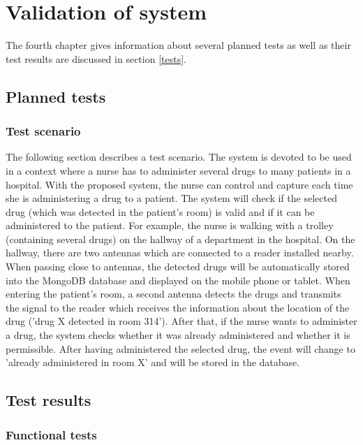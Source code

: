 \chapter{Validation of system}
\label{Kap4}

The fourth chapter gives information about several planned tests as well as their test results are discussed in section \ref{tests}.

\section{Planned tests}

\subsection{Test scenario}

The following section describes a test scenario. 
The system is devoted to be used in a context where a nurse has to administer several drugs to many patients in a hospital. With the proposed system, the nurse can control and capture each time she is administering a drug to a patient. The system will check if the selected drug (which was detected in the patient's room) is valid and if it can be administered to the patient. For example, the nurse is walking with a trolley (containing several drugs) on the hallway of a department in the hospital. On the hallway, there are two antennas which are connected to a reader installed nearby. When passing close to antennas, the detected drugs will be automatically stored into the MongoDB database and displayed on the mobile phone or tablet. 
When entering the patient's room, a second antenna detects the drugs and transmits the signal to the reader which receives the information about the location of the drug ('drug X detected in room 314'). After that, if the nurse wants to administer a drug, the system checks whether it was already administered and whether it is permissible. After having administered the selected drug, the event will change to 'already administered in room X' and will be stored in the database. 

\section{Test results}

\subsection{Functional tests}

